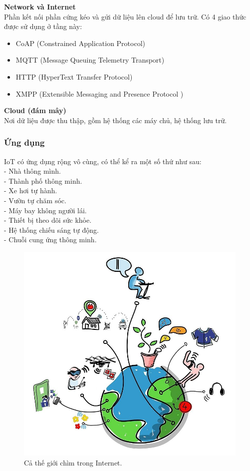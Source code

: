 \documentclass[a4paper,12pt,oneside]{article}
\begin{document}
\noindent \textbf{Network và Internet}\\
\noindent Phần kết nối phần cứng kéo và gửi dữ liệu lên cloud để lưu trữ. Có 4 giao thức được sử dụng ở tầng này:
\begin{itemize}
	\item CoAP (Constrained Application Protocol)
	\item MQTT (Message Queuing Telemetry Transport)
	\item HTTP (HyperText Transfer Protocol)
	\item XMPP (Extensible Messaging and Presence Protocol )
\end{itemize}

\noindent \textbf{Cloud (đám mây)}\\
\noindent Nơi dữ liệu được thu thập, gồm hệ thống các máy chủ, hệ thống lưu trữ.

\subsubsection{Ứng dụng}

\noindent IoT có ứng dụng rộng vô cùng, có thể kể ra một số thứ như sau:\\
- Nhà thông mình.\\
- Thành phố thông minh.\\
- Xe hơi tự hành.\\
- Vườn tự chăm sóc.\\
- Máy bay không người lái.\\
- Thiết bị theo dõi sức khỏe.\\
- Hệ thống chiếu sáng tự động.\\
- Chuỗi cung ứng thông minh.\\
\begin{figure}[H]
	\centering
	\includegraphics[scale=.4]{hinh/IoT_ungdung.jpg}
	\caption{Cả thế giới chìm trong Internet\cite{iot}.}
	\label{fig:IoT_ungdung}
\end{figure}
\end{document}
